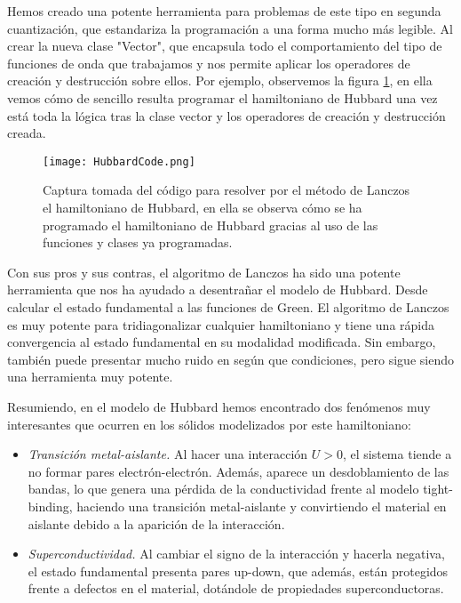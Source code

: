 \documentclass[12pt,twoside]{article}
\begin{document}
Hemos creado una potente herramienta para problemas de este tipo en segunda cuantización, que estandariza la programación a una forma mucho más legible. Al crear la nueva clase "Vector", que encapsula todo el comportamiento del tipo de funciones de onda que trabajamos y nos permite aplicar los operadores de creación y destrucción sobre ellos. Por ejemplo, observemos la figura \ref{fig:hubbardCode}, en ella vemos cómo de sencillo resulta programar el hamiltoniano de Hubbard una vez está toda la lógica tras la clase vector y los operadores de creación y destrucción creada.
\begin{figure}[h!]
  \begin{center}
    \texttt{[image: HubbardCode.png]}
  \end{center}
  \caption{Captura tomada del código para resolver por el método de Lanczos el hamiltoniano de Hubbard, en ella se observa cómo se ha programado el hamiltoniano de Hubbard gracias al uso de las funciones y clases ya programadas.}
  \label{fig:hubbardCode}
\end{figure}

Con sus pros y sus contras, el algoritmo de Lanczos ha sido una potente herramienta que nos ha ayudado a desentrañar el modelo de Hubbard. Desde calcular el estado fundamental a las funciones de Green. El algoritmo de Lanczos es muy potente para tridiagonalizar cualquier hamiltoniano y tiene una rápida convergencia al estado fundamental en su modalidad modificada. Sin embargo, también puede presentar mucho ruido en según que condiciones, pero sigue siendo una herramienta muy potente.

Resumiendo, en el modelo de Hubbard hemos encontrado dos fenómenos muy interesantes que ocurren en los sólidos modelizados por este hamiltoniano:
\begin{itemize}
  \item \textit{Transición metal-aislante.} Al hacer una interacción $U>0$, el sistema tiende a no formar pares electrón-electrón. Además, aparece un desdoblamiento de las bandas, lo que genera una pérdida de la conductividad frente al modelo tight-binding, haciendo una transición metal-aislante y convirtiendo el material en aislante debido a la aparición de la interacción.
  \item \textit{Superconductividad.} Al cambiar el signo de la interacción y hacerla negativa, el estado fundamental presenta pares up-down, que además, están protegidos frente a defectos en el material, dotándole de propiedades superconductoras.
\end{itemize}
\end{document}
